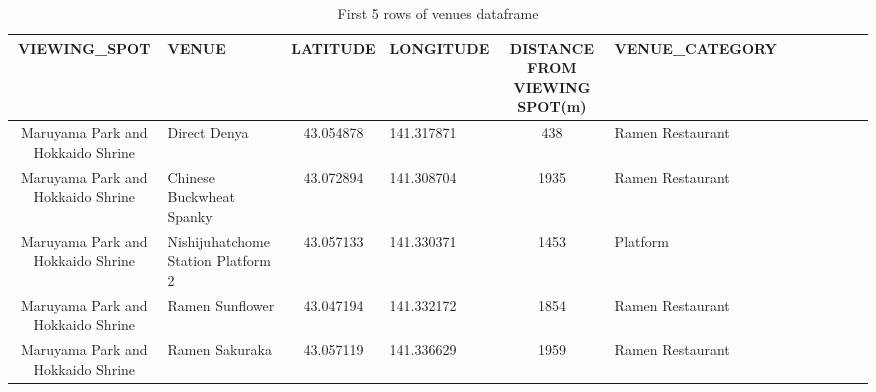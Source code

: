 \begin{table}[h]
\tiny
\centering
\caption{First 5 rows of venues dataframe}
\begin{tabular} {cp{2cm}cp{2cm}cp{2cm}cp{2cm}cp{2cm}cp{2cm}}
\toprule
VIEWING\_SPOT                     & VENUE                              &  LATITUDE       &  LONGITUDE       &  DISTANCE FROM VIEWING SPOT(m) & VENUE\_CATEGORY   \\
\hline
Maruyama Park and Hokkaido Shrine &                       Direct Denya & 43.054878       & 141.317871       &  438                               & Ramen Restaurant \\
Maruyama Park and Hokkaido Shrine &           Chinese Buckwheat Spanky & 43.072894       & 141.308704       & 1935                               & Ramen Restaurant \\
Maruyama Park and Hokkaido Shrine & Nishijuhatchome Station Platform 2 & 43.057133       & 141.330371       & 1453                               &         Platform \\
Maruyama Park and Hokkaido Shrine &                    Ramen Sunflower & 43.047194       & 141.332172       & 1854                               & Ramen Restaurant \\
Maruyama Park and Hokkaido Shrine &                     Ramen Sakuraka & 43.057119       & 141.336629       & 1959                               & Ramen Restaurant \\
\bottomrule
\end{tabular}
\end{table}
